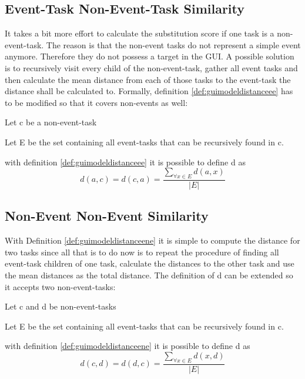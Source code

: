 \subsection{Event-Task Non-Event-Task Similarity}
It takes a bit more effort to calculate the substitution score if one task is a non-event-task. 
The reason is that the non-event tasks do not represent a simple event anymore. Therefore they do not possess a target in the GUI.
A possible solution is to recursively visit every child of the non-event-task, gather all event tasks and then calculate the mean distance from each of those tasks to the event-task the distance shall be calculated to.
Formally, definition \ref{def:guimodeldistanceee} has to be modified so that it covers non-events as well:

\begin{definition}
	\item Let c be a non-event-task
	\item Let E be the set containing all event-tasks that can be recursively found in c.
	\item with definition \ref{def:guimodeldistanceee} it is possible to define d as
\begin{equation*}
	d(a,c) = d(c,a) = \frac{\sum_{\forall x \in E} d(a,x)}{|E|}
\end{equation*}
\label{def:guimodeldistanceene}
\end{definition}

\subsection{Non-Event Non-Event Similarity}
With Definition \ref{def:guimodeldistanceene} it is simple to compute the distance for two tasks since all that is to do now is to repeat the procedure of finding all event-task children of one task, calculate the distances to the other task and use the mean distances as the total distance.
The definition of d can be extended so it accepts two non-event-tasks:

\begin{definition}
	\item Let c and d be non-event-tasks 
	\item Let E be the set containing all event-tasks that can be recursively found in c.
	\item with definition \ref{def:guimodeldistanceene} it is possible to define d as
	\begin{equation*}
		d(c,d) = d(d,c) = \frac{\sum_{\forall x \in E} d(x,d)}{|E|}
	\end{equation*}
\label{def:guimodeldistancenene}
\end{definition}
